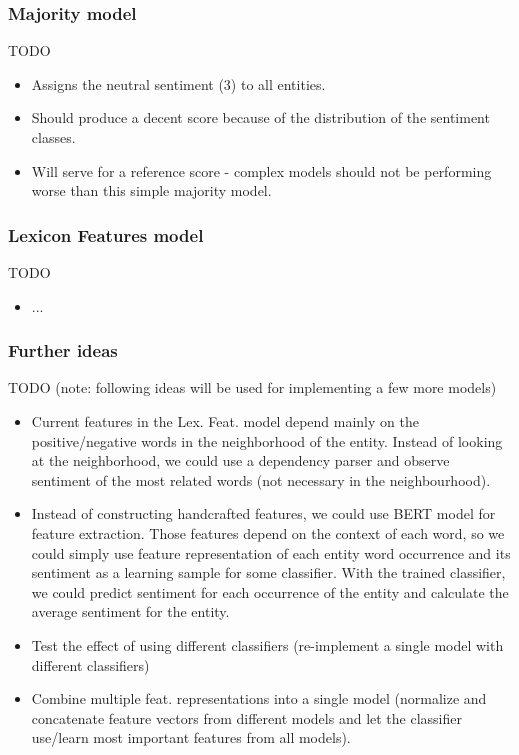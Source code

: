 \documentclass[11pt,a4paper]{article}
\begin{document}
\subsubsection{Majority model}

TODO
\begin{itemize}
    \item Assigns the neutral sentiment (3) to all entities.
    \item Should produce a decent score because of the distribution of the sentiment classes.
    \item Will serve for a reference score - complex models should not be performing worse than this simple majority model.
\end{itemize}

\subsubsection{Lexicon Features model}

TODO
\begin{itemize}
    \item ...
\end{itemize}

\subsubsection{Further ideas}

TODO (note: following ideas will be used for implementing a few more models)
\begin{itemize}
    \item Current features in the Lex. Feat. model depend mainly on the positive/negative words in the neighborhood of the entity. Instead of looking at the neighborhood, we could use a dependency parser and observe sentiment of the most related words (not necessary in the neighbourhood).
    \item Instead of constructing handcrafted features, we could use BERT model for feature extraction. Those features depend on the context of each word, so we could simply use feature representation of each entity word occurrence and its sentiment as a learning sample for some classifier. With the trained classifier, we could predict sentiment for each occurrence of the entity and calculate the average sentiment for the entity.
    \item Test the effect of using different classifiers (re-implement a single model with different classifiers)
    \item Combine multiple feat. representations into a single model (normalize and concatenate feature vectors from different models and let the classifier use/learn most important features from all models).
\end{itemize}
\end{document}
